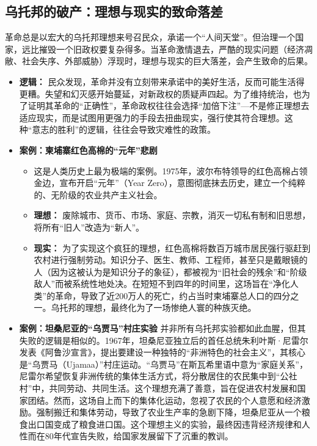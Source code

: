 \subsection{ 乌托邦的破产：理想与现实的致命落差}

革命总是以宏大的乌托邦理想来号召民众，承诺一个“人间天堂”。但治理一个国家，远比摧毁一个旧政权要复杂得多。当革命激情退去，严酷的现实问题（经济凋敝、社会失序、外部威胁）浮现时，理想与现实的巨大落差，会产生致命的后果。
\begin{itemize}
\item \textbf{逻辑：} 民众发现，革命并没有立刻带来承诺中的美好生活，反而可能生活得更糟。失望和幻灭感开始蔓延，对新政权的质疑声四起。为了维持统治，也为了证明其革命的“正确性”，革命政权往往会选择“加倍下注”---不是修正理想去适应现实，而是试图用更强力的手段去扭曲现实，强行使其符合理想。这种“意志的胜利”的逻辑，往往会导致灾难性的政策。
\item \textbf{案例：柬埔寨红色高棉的“元年”悲剧}
    \begin{itemize}
    \item 这是人类历史上最为极端的案例。1975年，波尔布特领导的红色高棉占领金边，宣布开启“元年”（Year Zero），意图彻底抹去历史，建立一个纯粹的、无阶级的农业共产主义社会。
    \item \textbf{理想：} 废除城市、货币、市场、家庭、宗教，消灭一切私有制和旧思想，将所有“旧人”改造为“新人”。
    \item \textbf{现实：} 为了实现这个疯狂的理想，红色高棉将数百万城市居民强行驱赶到农村进行强制劳动。知识分子、医生、教师、工程师，甚至只是戴眼镜的人（因为这被认为是知识分子的象征），都被视为“旧社会的残余”和“阶级敌人”而被系统性地处决。在短短不到四年的时间里，这场旨在“净化人类”的革命，导致了近200万人的死亡，约占当时柬埔寨总人口的四分之一。乌托邦的理想，最终化为了一场惨绝人寰的种族灭绝。
    \end{itemize}
\item \textbf{案例：坦桑尼亚的“乌贾马”村庄实验}
    并非所有乌托邦实验都如此血腥，但其失败的逻辑是相似的。1967年，坦桑尼亚独立后的首任总统朱利叶斯·尼雷尔发表《阿鲁沙宣言》，提出要建设一种独特的“非洲特色的社会主义”，其核心是“乌贾马（Ujamaa）”村庄运动。“乌贾马”在斯瓦希里语中意为“家庭关系”，尼雷尔希望恢复非洲传统的集体生活方式，将分散居住的农民集中到“公社村”中，共同劳动、共同生活。这个理想充满了善意，旨在促进农村发展和国家团结。然而，这场自上而下的集体化运动，忽视了农民的个人意愿和经济激励。强制搬迁和集体劳动，导致了农业生产率的急剧下降，坦桑尼亚从一个粮食出口国变成了粮食进口国。这个理想主义的实验，最终因违背经济规律和人性而在80年代宣告失败，给国家发展留下了沉重的教训。
\end{itemize}

